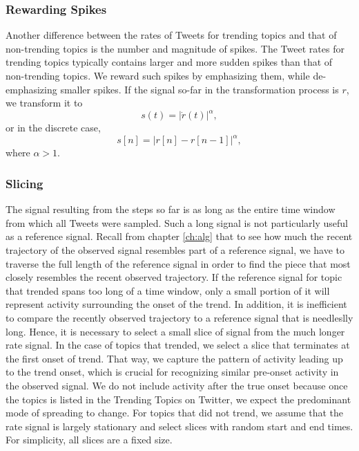 \subsubsection{Rewarding Spikes}
Another difference between the rates of Tweets for trending topics and that of
non-trending topics is the number and magnitude of spikes. The Tweet rates for
trending topics typically contains larger and more sudden spikes than that of
non-trending topics. We reward such spikes by emphasizing them, while
de-emphasizing smaller spikes. If the signal so-far in the transformation
process is $r$, we transform it to \[ s(t) = |\dot{r}(t)|^{\alpha},\] or in the
discrete case, \[ s[n] = |r[n] - r[n-1]|^{\alpha},\] where $\alpha > 1$.

\subsubsection{Slicing}
The signal resulting from the steps so far is as long as the entire time window
from which all Tweets were sampled. Such a long signal is not particularly
useful as a reference signal. Recall from chapter \ref{ch:alg} that to see how
much the recent trajectory of the observed signal resembles part of a reference
signal, we have to traverse the full length of the reference signal in order to
find the piece that most closely resembles the recent observed trajectory. If
the reference signal for topic that trended spans too long of a time window,
only a small portion of it will represent activity surrounding the onset of the
trend. In addition, it is inefficient to compare the recently observed
trajectory to a reference signal that is needleslly long. Hence, it is necessary
to select a small slice of signal from the much longer rate signal. In the case
of topics that trended, we select a slice that terminates at the first onset of
trend. That way, we capture the pattern of activity leading up to the trend
onset, which is crucial for recognizing similar pre-onset activity in the
observed signal. We do not include activity after the true onset because once
the topics is listed in the Trending Topics on Twitter, we expect the
predominant mode of spreading to change. For topics that did not trend, we
assume that the rate signal is largely stationary and select slices with random
start and end times. For simplicity, all slices are a fixed size.

